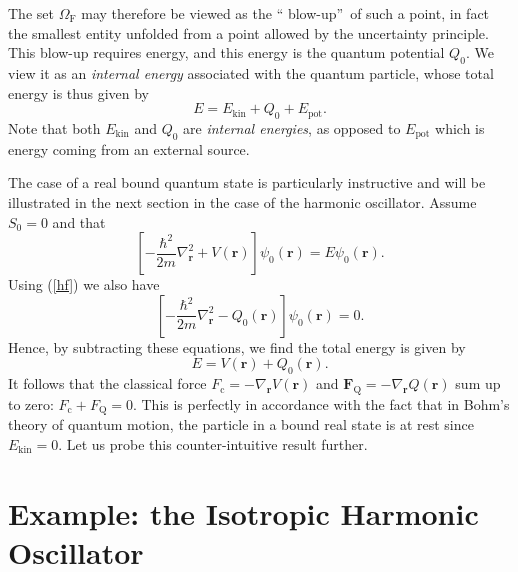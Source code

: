 \documentclass[12pt]{article}%
\begin{document}
The set $\Omega_{\mathrm{F}}$ may therefore be viewed as the \textquotedblleft
blow-up\textquotedblright\ of such a point, in fact the smallest entity
unfolded from a point allowed by the uncertainty principle. This blow-up
requires energy, and this energy is the quantum potential $Q_{0}$. We view it
as an \textit{internal energy} associated with the quantum particle, whose
total energy is thus given by
\begin{equation}
E=E_{\mathrm{kin}}+Q_{0}+E_{\mathrm{pot}}. \label{energy}%
\end{equation}
Note that both $E_{\mathrm{kin}}$ and $Q_{0}$ are \emph{internal energies}, as
opposed to $E_{\mathrm{pot}}$ which is energy coming from an external source.

The case of a real bound quantum state is particularly instructive and will be
illustrated in the next section in the case of the harmonic oscillator. Assume
$S_{0}=0$ and that\
\[
\left[  -\frac{\hbar^{2}}{2m}\nabla_{\mathbf{r}}^{2}+V(\mathbf{r})\right]
\psi_{0}(\mathbf{r})=E\psi_{0}(\mathbf{r}).
\]
Using (\ref{hf}) we also have%
\[
\left[  -\frac{\hbar^{2}}{2m}\nabla_{\mathbf{r}}^{2}-Q_{0}(\mathbf{r})\right]
\psi_{0}(\mathbf{r})=0.
\]
Hence, by subtracting these equations, we find the total energy is given by%
\begin{equation}
E=V(\mathbf{r})+Q_{0}(\mathbf{r}). \label{evq}%
\end{equation}
It follows that the classical force $F_{\mathrm{c}}=-\nabla_{\mathbf{r}%
}V(\mathbf{r})$ and $\mathbf{F}_{\mathrm{Q}}=-\nabla_{\mathbf{r}}%
Q(\mathbf{r})$ sum up to zero: $F_{\mathrm{c}}+F_{\mathrm{Q}}=0$. This is
perfectly in accordance with the fact that in Bohm's theory of quantum motion,
the particle in a bound real state is at rest since $E_{\mathrm{kin}}=0$. Let
us probe this counter-intuitive result further.

\section{Example: the Isotropic Harmonic Oscillator}
\end{document}
